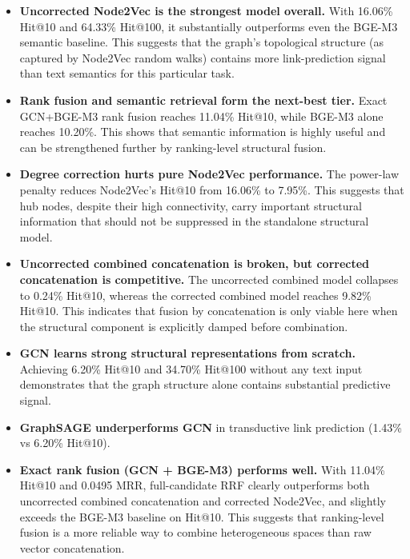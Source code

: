 \documentclass[12pt,a4paper]{article}
\begin{document}
\begin{itemize}
    \item \textbf{Uncorrected Node2Vec is the strongest model overall.} With 16.06\% Hit@10 and 64.33\% Hit@100, it substantially outperforms even the BGE-M3 semantic baseline. This suggests that the graph's topological structure (as captured by Node2Vec random walks) contains more link-prediction signal than text semantics for this particular task.

    \item \textbf{Rank fusion and semantic retrieval form the next-best tier.} Exact GCN+BGE-M3 rank fusion reaches 11.04\% Hit@10, while BGE-M3 alone reaches 10.20\%.  This shows that semantic information is highly useful and can be strengthened further by ranking-level structural fusion.

    \item \textbf{Degree correction hurts pure Node2Vec performance.} The power-law penalty reduces Node2Vec's Hit@10 from 16.06\% to 7.95\%. This suggests that hub nodes, despite their high connectivity, carry important structural information that should not be suppressed in the standalone structural model.

    \item \textbf{Uncorrected combined concatenation is broken, but corrected concatenation is competitive.} The uncorrected combined model collapses to 0.24\% Hit@10, whereas the corrected combined model reaches 9.82\% Hit@10.  This indicates that fusion by concatenation is only viable here when the structural component is explicitly damped before combination.

    \item \textbf{GCN learns strong structural representations from scratch.} Achieving 6.20\% Hit@10 and 34.70\% Hit@100 without any text input demonstrates that the graph structure alone contains substantial predictive signal.

    \item \textbf{GraphSAGE underperforms GCN} in transductive link prediction (1.43\% vs 6.20\% Hit@10).

    \item \textbf{Exact rank fusion (GCN + BGE-M3) performs well.} With 11.04\% Hit@10 and 0.0495 MRR, full-candidate RRF clearly outperforms both uncorrected combined concatenation and corrected Node2Vec, and slightly exceeds the BGE-M3 baseline on Hit@10.  This suggests that ranking-level fusion is a more reliable way to combine heterogeneous spaces than raw vector concatenation.
\end{itemize}
\end{document}
